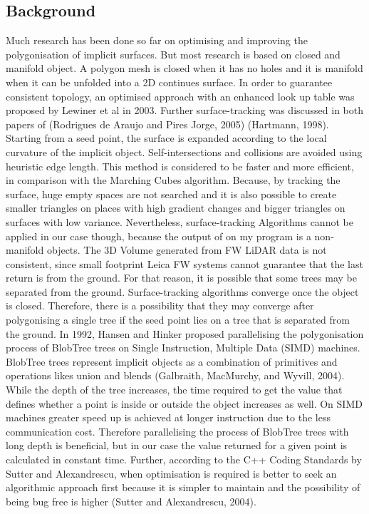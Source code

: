 \documentclass{subfiles}
\begin{document}
\subsection{Background}\label{Vis_Background}
Much research has been done so far on optimising and improving the polygonisation of implicit surfaces. But most research is based on closed and manifold object. A polygon mesh is closed when it has no holes and it is manifold when it can be unfolded into a 2D continues surface. In order to guarantee consistent topology, an optimised approach with an enhanced look up table was proposed by Lewiner et al in 2003. \newline\newline
Further surface-tracking was discussed in both papers of (Rodrigues de Araujo and Pires Jorge, 2005) (Hartmann, 1998). Starting from a seed point, the surface is expanded according to the local curvature of the implicit object. Self-intersections and collisions are avoided using heuristic edge length. This method is considered to be faster and more efficient, in comparison with the Marching Cubes algorithm. Because, by tracking the surface, huge empty spaces are not searched and it is also possible to create smaller triangles on places with high gradient changes and bigger triangles on surfaces with low variance. Nevertheless, surface-tracking Algorithms cannot be applied in our case though, because the output of on my program is a non-manifold objects. The 3D Volume generated from FW LiDAR data is not consistent, since small footprint Leica FW systems cannot guarantee that the last return is from the ground. For that reason, it is possible that some trees may be separated from the ground. Surface-tracking algorithms converge once the object is closed. Therefore, there is a possibility that they may converge after polygonising a single tree if the seed point lies on a tree that is separated from the ground. \newline\newline
In 1992, Hansen and Hinker proposed parallelising the polygonisation process of BlobTree trees on Single Instruction, Multiple Data (SIMD) machines. BlobTree trees represent implicit objects as a combination of primitives and operations likes union and blends (Galbraith, MacMurchy, and Wyvill, 2004). While the depth of the tree increases, the time required to get the value that defines whether a point is inside or outside the object increases as well. On SIMD machines greater speed up is achieved at longer instruction due to the less communication cost. Therefore parallelising the process of BlobTree trees with long depth is beneficial, but in our case the value returned for a given point is calculated in constant time. Further, according to the C++ Coding Standards by Sutter and Alexandrescu, when optimisation is required is better to seek an algorithmic approach first because it is simpler to maintain and the possibility of being bug free is higher (Sutter and Alexandrescu, 2004). \newline\newline
\end{document}
